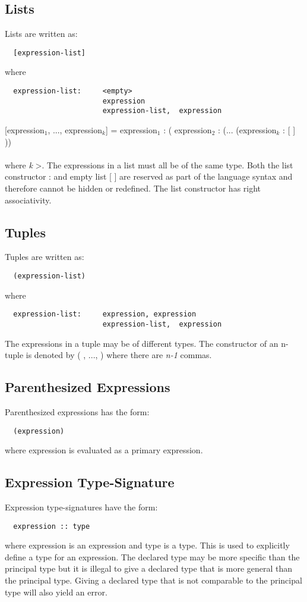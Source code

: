 \subsection{Lists}
Lists are written as:
  \begin{verbatim}
  [expression-list]\end{verbatim}
  where
  \begin{verbatim}
  expression-list:     <empty>
                       expression
                       expression-list,  expression \end{verbatim}
[expression$_{1}$, ..., expression$_{k}$]  =  expression$_{1}$ : ( expression$_{2}$ : (... (expression$_{k}$ : [ ] )) \\ \\
where \textit{k} \textgreater{}. The expressions in a list must all be of the same type. Both the list constructor : and empty list [ ] are reserved as part of the language syntax and therefore cannot be hidden or redefined. The list constructor has right associativity.

\subsection{Tuples}
Tuples are written as:
  \begin{verbatim}
  (expression-list)\end{verbatim}
  where
  \begin{verbatim}
  expression-list:     expression, expression
                       expression-list,  expression \end{verbatim}
The expressions in a tuple may be of different types. The constructor of an n-tuple is denoted by (\textunderscore
, ..., \textunderscore) where there are \textit{n-1} commas.

\subsection{Parenthesized Expressions}
Parenthesized expressions has the form:
  \begin{verbatim}
  (expression)\end{verbatim}
  where expression is evaluated as a primary expression.

\subsection{Expression Type-Signature}
Expression type-signatures have the form:
  \begin{verbatim}
  expression :: type \end{verbatim}
  where expression is an expression and type is a type. This is used to explicitly define a type for an expression. The declared type may be more specific than the principal type but it is illegal to give a declared type that is more general than the principal type. Giving a declared type that is not comparable to the principal type will also yield an error.

